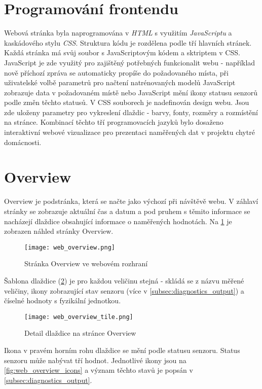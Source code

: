 \section{Programování frontendu} \label{sec:frontend}
Webová stránka byla naprogramována v \textit{HTML} s využitím \textit{JavaScriptu} a kaskádového stylu \textit{CSS}. Struktura kódu je rozdělena podle tří hlavních stránek. Každá stránka má svůj soubor s JavaScriptovým kódem a sktriptem v CSS. JavaScript je zde využitý pro zajištěný potřebných funkcionalit webu - například nově příchozí zpráva se automaticky propíše do požadovaného místa, při uživatelské volbě parametrů pro načtení natrénovaných modelů JavaScript zobrazuje data v požadovaném místě nebo JavaScript mění ikony statusu senzorů podle změn těchto statusů. V CSS souborech je nadefinován design webu. Jsou zde uloženy parametry pro vykreslení dlaždic - barvy, fonty, rozměry a rozmístění na stránce. Kombinací těchto tří programovacích jazyků bylo dosaženo interaktivní webové vizualizace pro prezentaci naměřených dat v projektu chytré domácnosti.

\section{Overview} \label{sec:overview}

Overview je podstránka, která se načte jako výchozí při návštěvě webu. V záhlaví stránky se zobrazuje aktuální čas a datum a pod pruhem s těmito informace se nacházejí dlaždice obsahující informace o naměřených hodnotách. Na \cref{fig:web_overview} je zobrazen náhled stránky Overview. 

\begin{figure}[H]
  \centering
  \texttt{[image: web\_overview.png]}
  \caption{Stránka Overview ve webovém rozhraní}
  \label{fig:web_overview}
\end{figure}  

Šablona dlaždice (\cref{fig:web_overview_tile}) je pro každou veličinu stejná - skládá se z názvu měřené veličiny, ikony zobrazující stav senzoru (více v \cref{subsec:diagnostics_output}) a číselné hodnoty s fyzikální jednotkou.

\begin{figure}[H]
  \centering
  \texttt{[image: web\_overview\_tile.png]}
  \caption{Detail dlaždice na stránce Overview}
  \label{fig:web_overview_tile}
\end{figure}

Ikona v pravém horním rohu dlaždice se mění podle statusu senzoru. Status senzoru může nabývat tří hodnot. Jednotlivé ikony jsou na \cref{fig:web_overview_icons} a význam těchto stavů je popsán v \cref{subsec:diagnostics_output}. 

